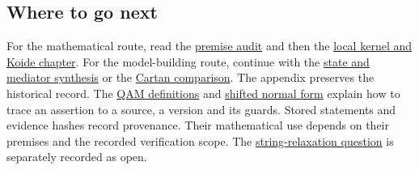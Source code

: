 \subsection*{Where to go next}

For the mathematical route, read the
\hyperref[v480:premise-audit]{premise audit} and then the
\hyperref[v480:koide-kernel]{local kernel and Koide chapter}.
For the model-building route, continue with the
\hyperref[sec:v410-state-mediator]{state and mediator synthesis}
or the \hyperref[v490:cartan-source]{Cartan comparison}.
The appendix preserves the historical record. The
\hyperref[v480:support-qam]{QAM definitions} and
\hyperref[v480:support-shift]{shifted normal form} explain how to trace
an assertion to a source, a version and its guards. Stored statements
and evidence hashes record provenance. Their mathematical use
depends on their premises and the recorded verification scope.
The \hyperref[sec:v500-string-relaxation]{string-relaxation question}
is separately recorded as open.

\clearpage

